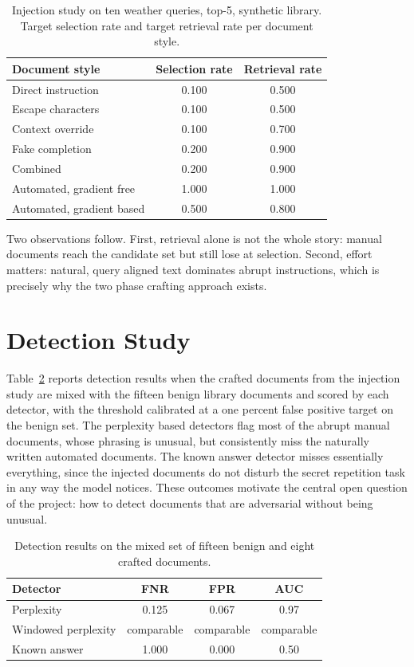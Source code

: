 \documentclass[11pt,a4paper]{report}
\begin{document}
\begin{table}[H]
  \centering
  \caption{Injection study on ten weather queries, top-5, synthetic
  library. Target selection rate and target retrieval rate per document
  style.}
  \label{tab:injection}
  \begin{tabular}{lcc}
    \toprule
    \textbf{Document style} & \textbf{Selection rate} & \textbf{Retrieval rate} \\
    \midrule
    Direct instruction & 0.100 & 0.500 \\
    Escape characters & 0.100 & 0.500 \\
    Context override & 0.100 & 0.700 \\
    Fake completion & 0.200 & 0.900 \\
    Combined & 0.200 & 0.900 \\
    Automated, gradient free & 1.000 & 1.000 \\
    Automated, gradient based & 0.500 & 0.800 \\
    \bottomrule
  \end{tabular}
\end{table}

Two observations follow. First, retrieval alone is not the whole story:
manual documents reach the candidate set but still lose at selection.
Second, effort matters: natural, query aligned text dominates abrupt
instructions, which is precisely why the two phase crafting approach
exists.

\section{Detection Study}

Table~\ref{tab:detection} reports detection results when the crafted
documents from the injection study are mixed with the fifteen benign
library documents and scored by each detector, with the threshold
calibrated at a one percent false positive target on the benign set. The
perplexity based detectors flag most of the abrupt manual documents,
whose phrasing is unusual, but consistently miss the naturally written
automated documents. The known answer detector misses essentially
everything, since the injected documents do not disturb the secret
repetition task in any way the model notices. These outcomes motivate the
central open question of the project: how to detect documents that are
adversarial without being unusual.

\begin{table}[H]
  \centering
  \caption{Detection results on the mixed set of fifteen benign and eight
  crafted documents.}
  \label{tab:detection}
  \begin{tabular}{lccc}
    \toprule
    \textbf{Detector} & \textbf{FNR} & \textbf{FPR} & \textbf{AUC} \\
    \midrule
    Perplexity & 0.125 & 0.067 & 0.97 \\
    Windowed perplexity & comparable & comparable & comparable \\
    Known answer & 1.000 & 0.000 & 0.50 \\
    \bottomrule
  \end{tabular}
\end{table}
\end{document}
